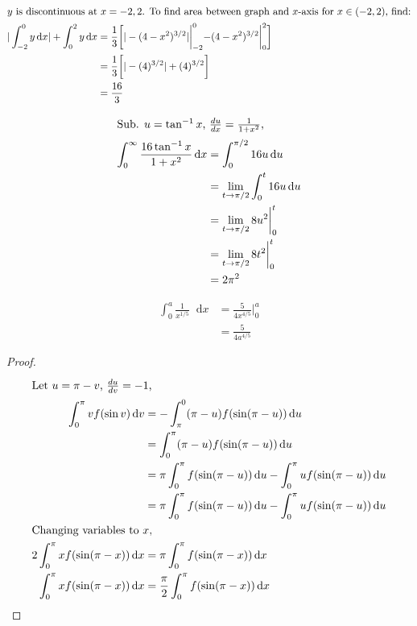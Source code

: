 \documentclass[12pt]{article}
\newcommand*\diff{\mathop{}\!\mathrm{d}}
\newenvironment{problem}[2][Problem]{\begin{trivlist}
\item[\hskip \labelsep {\bfseries #1}\hskip \labelsep {\bfseries #2.}]}{\end{trivlist}}
\begin{document}
\begin{problem}{3.b}
\end{problem}
\begin{align*}
\intertext{$y$ is discontinuous at $x = {-2, 2}$. To find area between graph and $x$-axis for $x \in (-2,2)$, find:}
|\int_{-2}^{0} y \diff x| + \int_{0}^{2} y \diff x &= \frac{1}{3} \biggl[|-(4-x^2)^{3/2}|\biggl|_{-2}^{0} -(4-x^2)^{3/2} \biggl|_{0}^{2}\biggl]\\
&= \frac{1}{3} \biggl[|-(4)^{3/2}| +(4)^{3/2}\biggl]\\
&= \frac{16}{3} 
\end{align*}

\begin{problem}{4.b}
\end{problem}
\begin{align*}
\intertext{Sub. $u = \tan ^{-1} x$, $\frac{du}{dx} = \frac{1}{1 + x^2}$,}
\int_{0}^{\infty} \frac{16\tan^{-1}x}{1+x^2} \diff x &= \int_{0}^{\pi /2} 16u \diff u\\
&= \lim_{t \to \pi/2} \int_{0}^{t} 16u \diff u\\
&= \lim_{t \to \pi/2} 8u^2 \biggl|_{0}^{t} \\
&= \lim_{t \to \pi/2} 8t^2 \biggl|_{0}^{t} \\
&= 2\pi^2
\end{align*}

\begin{problem}{4.c}
\end{problem}
\begin{align*}
\int_{0}^{a} \frac{1}{x^{1/5}} \diff x &= \frac{5}{4x^{4/5}} \biggl|_{0}^{a} \\
&= \frac{5}{4a^{4/5}} 
\end{align*}

\begin{problem}{5.i}
\end{problem}
\begin{proof}
\begin{align*}
\intertext{Let $u = \pi - v$, $\frac{du}{dv} = -1$,}
\int_{0}^{\pi} vf(\sin v) \diff v &= -\int_{\pi}^{0} (\pi - u) f(\sin (\pi - u)) \diff u\\
&= \int_{0}^{\pi} (\pi - u) f(\sin (\pi - u)) \diff u\\
&= \pi \int_{0}^{\pi} f(\sin (\pi - u)) \diff u - \int_{0}^{\pi} u f(\sin (\pi - u)) \diff u\\
&= \pi \int_{0}^{\pi} f(\sin (\pi - u)) \diff u - \int_{0}^{\pi} u f(\sin (\pi - u)) \diff u\\
\intertext{Changing variables to $x$,}
2\int_{0}^{\pi} x f(\sin (\pi - x)) \diff x &= \pi \int_{0}^{\pi} f(\sin (\pi - x)) \diff x\\  
\int_{0}^{\pi} x f(\sin (\pi - x)) \diff x &= \frac{\pi}{2} \int_{0}^{\pi} f(\sin (\pi - x)) \diff x\\  
\end{align*}
\end{proof}
\end{document}
